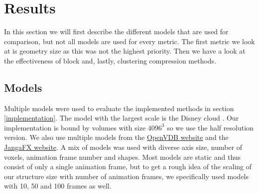 \section{Results} \label{results}
In this section we will first describe the different models that are used for comparison, but not all models are used for every metric. The first metric we look at is geometry size as this was not the highest priority. Then we have a look at the effectiveness of block and, lastly, clustering compression methods. 


\subsection{Models} \label{results:models}
Multiple models were used to evaluate the implemented methods in section \ref{implementation}. The model with the largest scale is the Disney cloud \cite{DisneyCloud}. Our implementation is bound by volumes with size $4096^3$ so we use the half resolution version. We also use multiple models from the \href{https://www.openvdb.org/download/}{OpenVDB website} and the \href{https://jangafx.com/software/embergen/download/free-vdb-animations/}{JangaFX website}. A mix of models was used with diverse axis size, number of voxels, animation frame number and shapes. Most models are static and thus consist of only a single animation frame, but to get a rough idea of the scaling of our structure size with number of animation frames, we specifically used models with 10, 50 and 100 frames as well.

